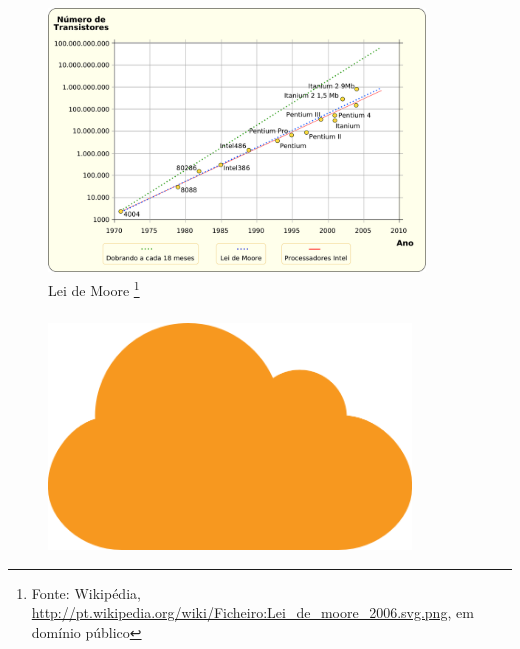 \documentclass{beamer}
\begin{document}
\begin{frame}
\frametitle{}

\begin{figure}[htp]
\begin{center}
  \includegraphics[height=7cm]{Lei_de_moore_2006.png}
  \caption[map]{Lei de Moore \footnote{\tiny
  Fonte: Wikipédia, \url{http://pt.wikipedia.org/wiki/Ficheiro:Lei_de_moore_2006.svg.png},
  em domínio público}}
\end{center}
\end{figure}


\end{frame}

\begin{frame}
\frametitle{}

\begin{figure}[htp]
\begin{center}
  \includegraphics[height=6cm]{nuvem.png}
\end{center}
\end{figure}


\end{frame}
\end{document}
